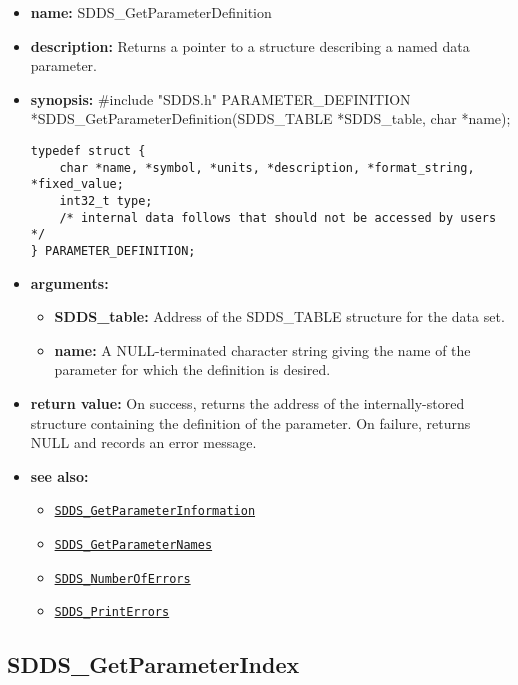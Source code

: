\documentclass[11pt]{article}
\newcommand{\progref}[1]{\hyperref[SDDS_#1]{\tt SDDS\_#1}}
\begin{document}
\begin{itemize}
\item {\bf name:}\newline
SDDS\_GetParameterDefinition
\item {\bf description:}\newline
Returns a pointer to a structure describing a named data parameter.
\item {\bf synopsis:} \#include "SDDS.h"\newline
PARAMETER\_DEFINITION *SDDS\_GetParameterDefinition(SDDS\_TABLE *SDDS\_table, char *name);\newline
\begin{verbatim}
typedef struct {
    char *name, *symbol, *units, *description, *format_string, *fixed_value;
    int32_t type;
    /* internal data follows that should not be accessed by users */
} PARAMETER_DEFINITION;
\end{verbatim}
\item {\bf arguments:}
\begin{itemize}
\item {\bf SDDS\_table:} Address of the SDDS\_TABLE structure for the data set.
\item {\bf name:} A NULL-terminated character string giving the name of the parameter for which the definition is desired.
\end{itemize}
\item {\bf return value:}\newline
On success, returns the address of the internally-stored structure containing the definition of the parameter. On failure, returns NULL and records an error message.
\item {\bf see also:}
\begin{itemize}
\item \progref{GetParameterInformation}
\item \progref{GetParameterNames}
\item \progref{NumberOfErrors}
\item \progref{PrintErrors}
\end{itemize}
\end{itemize}

\subsection{SDDS\_GetParameterIndex}
\label{SDDS_GetParameterIndex}
\end{document}
